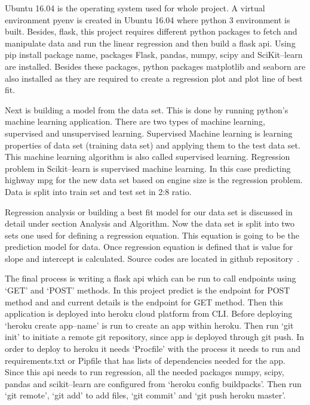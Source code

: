  Ubuntu 16.04 is the operating system used for whole project.
 A virtual environment pyenv is created in Ubuntu 16.04 where python 3
 environment is built. Besides, flask, this project requires different python
 packages to fetch and manipulate data and run the linear regression and
 then build a flask api. Using pip install package name, packages Flask,
 pandas, numpy, scipy and SciKit--learn are installed. Besides these
 packages, python packages matplotlib and seaborn are also installed as they
 are required to create a regression plot and plot line of best fit. 
 
 Next is building a model from the data set. This is done by
 running python's machine learning application. There are two types of
 machine learning, supervised and unsupervised learning. Supervised
 Machine learning is learning properties of data set (training data set)
 and applying them to the test data set. This machine learning algorithm
 is also called supervised learning. Regression problem in Scikit--learn
 is supervised machine learning. In this case predicting highway mpg for
 the new data set based on engine size is the regression problem. Data
 is split into train set and test set in 2:8 ratio.
    
  Regression analysis or building a best fit model for our data set is
  discussed in detail under section Analysis and Algorithm. Now the data
   set is split into two sets one used for defining a regression 
   equation. This equation is going to be the prediction model for data.
   Once regression equation is defined
   that is value for slope and intercept is calculated.   
   Source codes are located in github repository~\cite{hid-sp18-415-regression}.
   
 The final process is writing a flask api which can be run to call 
 endpoints using `GET' and `POST' methods. In this project predict is the
 endpoint for POST method and and current details is the endpoint for GET
 method. Then this application is deployed into heroku cloud platform from
 CLI. Before deploying `heroku create app--name' is run to create an app within
 heroku. Then run `git init' to initiate a remote git repository, since app is 
 deployed through git push. In order to deploy to heroku it needs `Procfile'
 with the process it needs to run and requirements.txt or Pipfile that has lists 
 of dependencies needed for the app. Since this api needs to run regression, all
 the needed packages numpy, scipy, pandas and scikit--learn are configured from 
 `heroku config buildpacks'. Then run `git remote', `git add' to add files,  
 `git commit' and `git push heroku master'.
    

